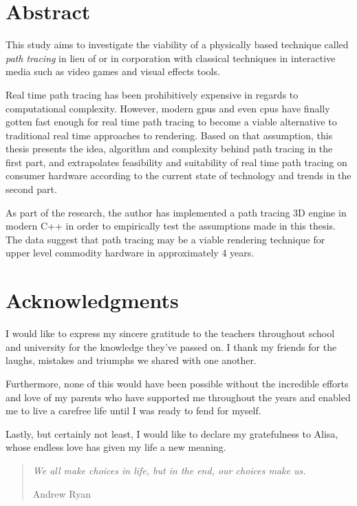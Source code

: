 \documentclass[
  twoside,
  11pt, a4paper,
  footinclude=true,
  headinclude=true,
  cleardoublepage=empty
]{scrreprt}
\begin{document}


\chapter*{Abstract}
\onehalfspace
This study aims to investigate the viability of a physically based technique called
\emph{path tracing} in lieu of or in corporation with classical techniques in interactive media
such as video games and visual effects tools.

Real time path tracing has been prohibitively expensive in regards to computational complexity.
However, modern \acs{gpu}s and even \acs{cpu}s have finally gotten fast enough for real time path
tracing to become a viable alternative to traditional real time approaches to rendering.  Based on
that assumption, this thesis presents the idea, algorithm and complexity behind path tracing in the
first part, and extrapolates feasibility and suitability of real time path tracing on consumer
hardware according to the current state of technology and trends in the second part.

As part of the research, the author has implemented a path tracing 3D engine in modern C++ in order
to empirically test the assumptions made in this thesis. The data suggest that  path tracing may be a
viable rendering technique for upper level commodity hardware in approximately 4 years.
\singlespace

\chapter*{Acknowledgments}
\doublespacing
I would like to express my sincere gratitude to the teachers throughout school and university for
the knowledge they've passed on.
I thank my friends for the laughs, mistakes and triumphs we shared with one another.

Furthermore, none of this would have been possible without the incredible efforts and love of my
parents who have supported me throughout the years and enabled me to live a carefree life until I
was ready to fend for myself.

Lastly, but certainly not least, I would like to declare my gratefulness to Alisa, whose endless love
has given my life a new meaning.

\singlespace

\clearpage
\vspace*{\fill}
\thispagestyle{empty} %
\begin{quotation}
    \em
    We all make choices in life, but in the end, our choices make us.

    \medskip
    \raggedleft
    Andrew Ryan
\end{quotation}
\vspace*{\fill}
\end{document}
